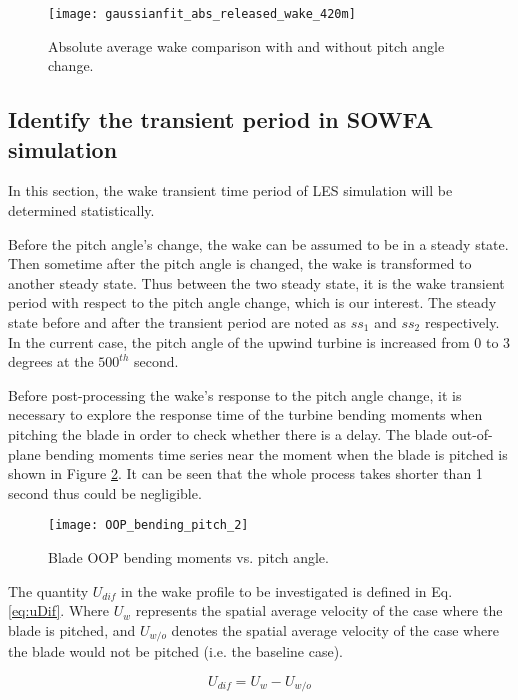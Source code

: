 \documentclass{umthesis}
\begin{document}
\begin{figure}
  \centering
  \texttt{[image: gaussianfit\_abs\_released\_wake\_420m]}
  \caption{Absolute average wake comparison with and without pitch angle change.}\label{fig:gaussianfit_abs_released_wake_420m}
\end{figure}

\subsection{Identify the transient period in SOWFA simulation}
In this section, the wake transient time period of LES simulation will be determined statistically. 

Before the pitch angle's change, the wake can be assumed to be in a steady state. Then sometime after the pitch angle is changed, the wake is transformed to another steady state. Thus between the two steady state, it is the wake transient period with respect to the pitch angle change, which is our interest. The steady state before and after the transient period are noted as $ss_1$ and $ss_2$ respectively. In the current case, the pitch angle of the upwind turbine is increased from 0 to 3 degrees at the $500^{th}$ second.

Before post-processing the wake's response to the pitch angle change, it is necessary to explore the response time of the turbine bending moments when pitching the blade in order to check whether there is a delay. The blade out-of-plane bending moments time series near the moment when the blade is pitched is shown in Figure \ref{fig:OOP_bending_pitch_2}. It can be seen that the whole process takes shorter than 1 second thus could be negligible. 

\begin{figure}
  \centering
  \texttt{[image: OOP\_bending\_pitch\_2]}
  \caption{Blade OOP bending moments vs. pitch angle.}\label{fig:OOP_bending_pitch_2}
\end{figure}
 

The quantity $U_{dif}$ in the wake profile to be investigated is defined in Eq. \ref{eq:uDif}. Where $U_{w}$ represents the spatial average velocity of the case where the blade is pitched, and $U_{w/o}$ denotes the spatial average velocity of the case where the blade would not be pitched (i.e. the baseline case). 

\begin{equation}\label{eq:uDif}
  U_{dif} = U_{w} - U_{w/o}
\end{equation}
\end{document}
